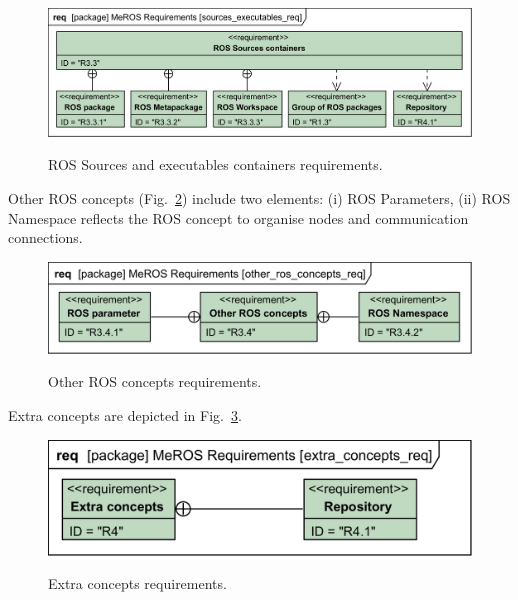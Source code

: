 \documentclass[11pt,oneside,a4paper]{report}
\begin{document}
	\begin{figure}[H]
		\centering
		\begin{center}
			{\includegraphics[scale=1.0]{diagrams/sources_executables_req.png}}
		\end{center}
		\caption{ROS Sources and executables containers requirements.} 
		\label{fig:sources_executables_req}
	\end{figure}
	
	\pagebreak
	
	Other ROS concepts (Fig.~\ref{fig:other_ros_concepts_req}) include two elements: (i) ROS Parameters, (ii) ROS Namespace reflects the ROS concept to organise nodes and communication connections.
	
	\begin{figure}[H]
			\centering
			\begin{center}
					{\includegraphics[scale=1.0]{diagrams/other_ros_concepts_req.png}}
				\end{center}
			\caption{Other ROS concepts requirements.} 
			\label{fig:other_ros_concepts_req}
		\end{figure}

Extra concepts are depicted in Fig.~\ref{fig:extra_concepts_req}.

\begin{figure}[H]
	\centering
	\begin{center}
		{\includegraphics[scale=1.0]{diagrams/extra_concepts_req.png}}
	\end{center}
	\caption{Extra concepts requirements.} 
	\label{fig:extra_concepts_req}
\end{figure}
\end{document}

